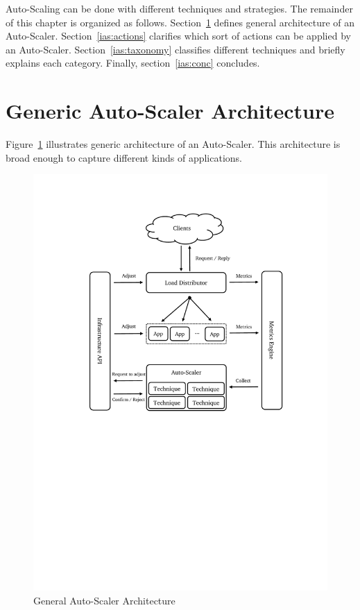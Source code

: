 Auto-Scaling can be done with different techniques and strategies. The remainder of this chapter is organized as follows. Section~\ref{ias:arch} defines general architecture of an Auto-Scaler. Section~\ref{ias:actions} clarifies which sort of actions can be applied by an Auto-Scaler. Section~\ref{ias:taxonomy} classifies different techniques and briefly explains each category. Finally, section~\ref{ias:conc} concludes.

\section{Generic Auto-Scaler Architecture}
\label{ias:arch}

Figure~\ref{fig:auto-scaler-arch} illustrates generic architecture of an Auto-Scaler. This architecture is broad enough to capture different kinds of applications.
\begin{figure}[ht]
    \centering
    \includegraphics[clip, trim=3cm 12.5cm 2.5cm 2.5cm]{auto-scaler-arch.pdf}
    \caption{General Auto-Scaler Architecture}
    \label{fig:auto-scaler-arch}
\end{figure}
